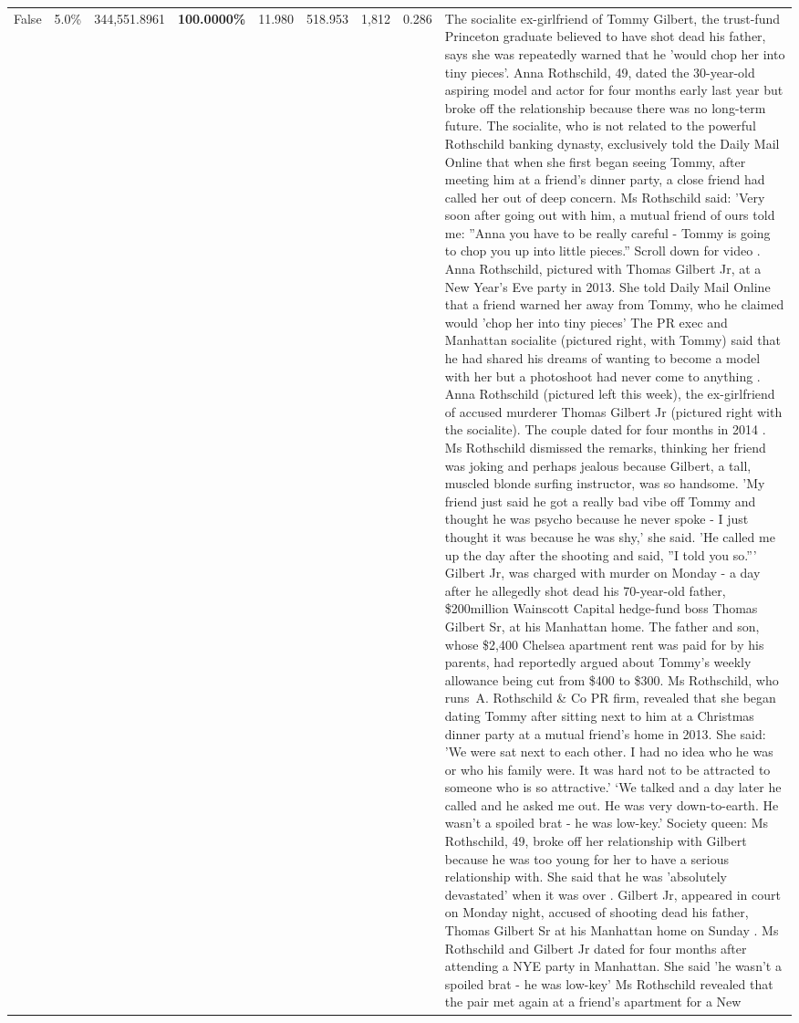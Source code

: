 \begin{table}[H]
\begin{tabular}{lllrlllll}
False & 5.0\% & 344,551.8961 & \bfseries \color{red} 100.0000\% & 11.980 & 518.953 & 1,812 & 0.286 & The socialite ex-girlfriend of Tommy Gilbert, the trust-fund Princeton graduate believed to have shot dead his father, says she was repeatedly warned that he 'would chop her into tiny pieces'. Anna Rothschild, 49, dated the 30-year-old aspiring model and actor for four months early last year but broke off the relationship because there was no long-term future. The socialite, who is not related to the powerful Rothschild banking dynasty, exclusively told the Daily Mail Online that when she first began seeing Tommy, after meeting him at a friend's dinner party, a close friend had called her out of deep concern. Ms Rothschild said: 'Very soon after going out with him, a mutual friend of ours told me: ''Anna you have to be really careful - Tommy is going to chop you up into little pieces.'' Scroll down for video . Anna Rothschild, pictured with Thomas Gilbert Jr, at a New Year's Eve party in 2013. She told Daily Mail Online that a friend warned her away from Tommy, who he claimed would 'chop her into tiny pieces' The PR exec and Manhattan socialite (pictured right, with Tommy) said that he had shared his dreams of wanting to become a model with her but a photoshoot had never come to anything . Anna Rothschild (pictured left this week), the ex-girlfriend of accused murderer Thomas Gilbert Jr (pictured right with the socialite). The couple dated for four months in 2014 . Ms Rothschild dismissed the remarks, thinking her friend was joking and perhaps jealous because Gilbert, a tall, muscled blonde surfing instructor, was so handsome. 'My friend just said he got a really bad vibe off Tommy and thought he was psycho because he never spoke - I just thought it was because he was shy,' she said. 'He called me up the day after the shooting and said, ''I told you so.''' Gilbert Jr, was charged with murder on Monday - a day after he allegedly shot dead his 70-year-old father, \$200million Wainscott Capital hedge-fund boss Thomas Gilbert Sr, at his Manhattan home. The father and son, whose \$2,400 Chelsea apartment rent was paid for by his parents, had reportedly argued about Tommy's weekly allowance being cut from \$400 to \$300. Ms Rothschild, who runs A. Rothschild \& Co PR firm, revealed that she began dating Tommy after sitting next to him at a Christmas dinner party at a mutual friend's home in 2013. She said: 'We were sat next to each other. I had no idea who he was or who his family were. It was hard not to be attracted to someone who is so attractive.' ‘We talked and a day later he called and he asked me out. He was very down-to-earth. He wasn’t a spoiled brat - he was low-key.’ Society queen: Ms Rothschild, 49, broke off her relationship with Gilbert because he was too young for her to have a serious relationship with. She said that he was 'absolutely devastated' when it was over . Gilbert Jr, appeared in court on Monday night, accused of shooting dead his father, Thomas Gilbert Sr at his Manhattan home on Sunday . Ms Rothschild and Gilbert Jr dated for four months after attending a NYE party in Manhattan. She said 'he wasn't a spoiled brat - he was low-key' Ms Rothschild revealed that the pair met again at a friend’s apartment for a New 
\end{tabular}
\end{table}
